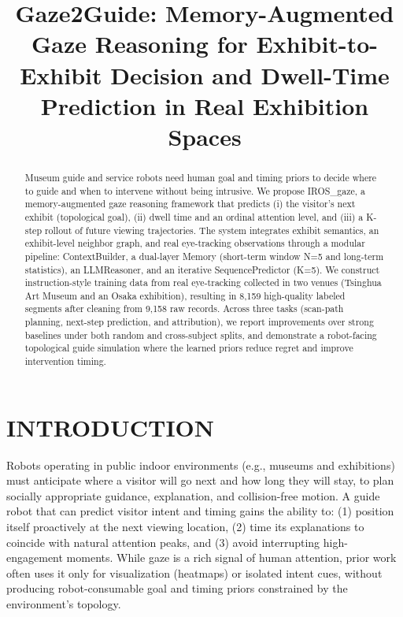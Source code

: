\documentclass{letterpaper,article}
\begin{document}
\title{Gaze2Guide: Memory-Augmented Gaze Reasoning for Exhibit-to-Exhibit Decision and Dwell-Time Prediction in Real Exhibition Spaces}
\author{}
\date{}

\maketitle

\begin{abstract}
Museum guide and service robots need human goal and timing priors to decide where to guide and when to intervene without being intrusive. We propose IROS\_gaze, a memory-augmented gaze reasoning framework that predicts (i) the visitor's next exhibit (topological goal), (ii) dwell time and an ordinal attention level, and (iii) a K-step rollout of future viewing trajectories. The system integrates exhibit semantics, an exhibit-level neighbor graph, and real eye-tracking observations through a modular pipeline: ContextBuilder, a dual-layer Memory (short-term window N=5 and long-term statistics), an LLMReasoner, and an iterative SequencePredictor (K=5). We construct instruction-style training data from real eye-tracking collected in two venues (Tsinghua Art Museum and an Osaka exhibition), resulting in 8,159 high-quality labeled segments after cleaning from 9,158 raw records. Across three tasks (scan-path planning, next-step prediction, and attribution), we report improvements over strong baselines under both random and cross-subject splits, and demonstrate a robot-facing topological guide simulation where the learned priors reduce regret and improve intervention timing.
\end{abstract}

\section{INTRODUCTION}

Robots operating in public indoor environments (e.g., museums and exhibitions) must anticipate where a visitor will go next and how long they will stay, to plan socially appropriate guidance, explanation, and collision-free motion. A guide robot that can predict visitor intent and timing gains the ability to: (1) position itself proactively at the next viewing location, (2) time its explanations to coincide with natural attention peaks, and (3) avoid interrupting high-engagement moments. While gaze is a rich signal of human attention, prior work often uses it only for visualization (heatmaps) or isolated intent cues, without producing robot-consumable goal and timing priors constrained by the environment's topology.
\end{document}
